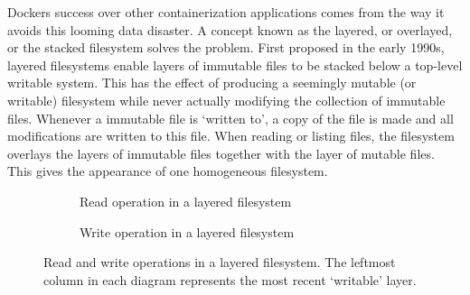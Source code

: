 Dockers success over other containerization applications comes from the way it avoids this looming data disaster.
A concept known as the layered, or overlayed, or the stacked filesystem solves the problem.
First proposed in the early 1990s, layered filesystems enable layers of immutable files to be stacked below a top-level writable system.
This has the effect of producing a seemingly mutable (or writable) filesystem while never actually modifying the collection of immutable files.
Whenever a immutable file is `written to', a copy of the file is made and all modifications are written to this file.
When reading or listing files, the filesystem overlays the layers of immutable files together with the layer of mutable files.
This gives the appearance of one homogeneous filesystem.

\begin{figure}[h]
\centering
\begin{subfigure}[b]{0.5\textwidth}
\caption{Read operation in a layered filesystem}
\end{subfigure}
\begin{subfigure}[b]{0.45\textwidth}
\caption{Write operation in a layered filesystem}
\end{subfigure}

\caption{Read and write operations in a layered filesystem. The leftmost column in each diagram represents the most recent `writable' layer.}
\end{figure}

